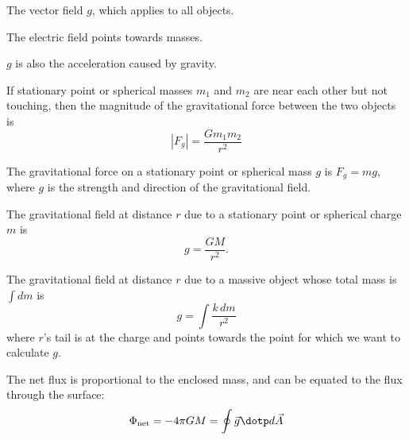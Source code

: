 \begin{definition}
  The vector field $g$, which applies to all objects.

  The electric field points towards masses.

	$g$ is also the acceleration caused by gravity.
\end{definition}

\begin{namedlaw}
  If stationary point or spherical masses $m_1$ and $m_2$ are near each other but not touching, then the magnitude of the gravitational force between the two objects is
  \[
    |F_g| = \frac{G m_1 m_2}{r^2}
  \]
\end{namedlaw}

\begin{law}
  The gravitational force on a stationary point or spherical mass $g$ is $F_g = mg$, where $g$ is the strength and direction of the gravitational field.
\end{law}

\begin{law}
  The gravitational field at distance $r$ due to a stationary point or spherical charge $m$ is
  \[
    g = \frac{GM}{r^2}.
  \]

  The gravitational field at distance $r$ due to a massive object whose total mass is $\int dm$ is
  \[
    g = \int \frac{k \,dm}{r^2}
  \]
  where $r$'s tail is at the charge and points towards the point for which we want to calculate $g$.
\end{law}

\begin{namedtheorem}
  The net flux is proportional to the enclosed mass, and can be equated to the flux through the surface:
  \[
    \Phi_{\text{net}} = - 4\pi G M = \oint \vec{g} \dotp d\vec{A}
  \]
\end{namedtheorem}
